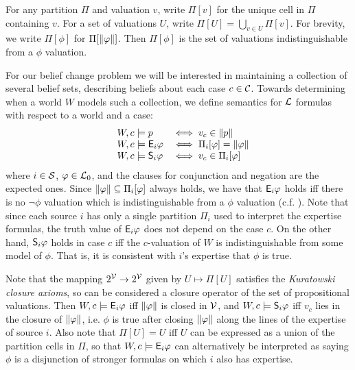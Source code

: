 For any partition $\Pi$ and valuation $v$, write $\Pi[v]$ for the unique cell
in $\Pi$ containing $v$. For a set of valuations $U$, write $\Pi[U] =
\bigcup_{v \in U}{\Pi[v]}$. For brevity, we write $\Pi[\phi]$ for
$\Pi[\propmods{\phi}]$. Then $\Pi[\phi]$ is the set of valuations
indistinguishable from a $\phi$ valuation.

For our belief change problem we will be interested in maintaining a
collection of several belief sets, describing beliefs about each case $c \in
\C$. Towards determining when a world $W$ models such a collection, we define
semantics for $\lext$ formulas with respect to a world and a case:
\[
    \begin{array}{lll}
        &W, c \models p &\iff v_c \in \propmods{p} \\
        &W, c \models \E_i\phi &\iff \Pi_i[\phi] = \propmods{\phi} \\
        &W, c \models \S_i\phi &\iff v_c \in \Pi_i[\phi]
    \end{array}
\]
where $i \in \srcs$, $\phi \in \lprop$, and the clauses for conjunction and
negation are the expected ones. Since $\propmods{\phi} \subseteq \Pi_i[\phi]$
always holds, we have that $\E_i\phi$ holds iff there is no
$\neg\phi$ valuation which is indistinguishable from a $\phi$ valuation (c.f.
\textcite{booth_trust_2018}). Note
that since each source $i$ has only a single partition $\Pi_i$ used to
interpret the expertise formulas, the truth value of $\E_i\phi$ does not
depend on the case $c$. On the other hand, $\S_i\phi$ holds in case $c$ iff
the $c$-valuation of $W$ is indistinguishable from some model of $\phi$. That
is, it is consistent with $i$'s expertise that $\phi$ is true.

Note that the mapping $2^\vals \to 2^\vals$ given by $U \mapsto \Pi[U]$
satisfies the \emph{Kuratowski closure axioms},\footnotemark{} so can be
considered a closure operator of the set of propositional valuations. Then $W,
c \models \E_i\phi$ iff $\propmods{\phi}$ is closed in $\vals$, and $W, c \models
\S_i\phi$ iff $v_c$ lies in the closure of $\propmods{\phi}$, i.e. $\phi$ is
true after closing $\propmods{\phi}$ along the lines of the expertise of source
$i$. Also note that $\Pi[U] = U$ iff $U$ can be expressed as a union of the
partition cells in $\Pi$, so that $W, c \models \E_i\phi$ can alternatively be
interpreted as saying $\phi$ is a disjunction of stronger formulas on which $i$
also has expertise.
%


